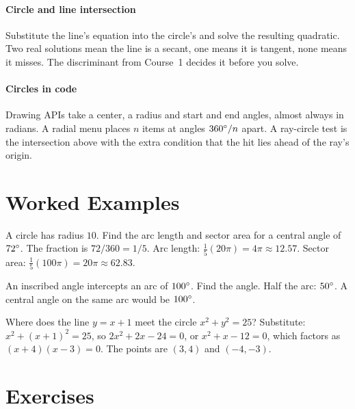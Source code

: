 \paragraph{Circle and line intersection} Substitute the line's equation into the circle's and solve the resulting quadratic. Two real solutions mean the line is a secant, one means it is tangent, none means it misses. The discriminant from Course~1 decides it before you solve.

\paragraph{Circles in code} Drawing APIs take a center, a radius and start and end angles, almost always in radians. A radial menu places $n$ items at angles $360^\circ/n$ apart. A ray-circle test is the intersection above with the extra condition that the hit lies ahead of the ray's origin.

\section{Worked Examples}

\begin{example}
A circle has radius $10$. Find the arc length and sector area for a central angle of $72^\circ$.
\solution The fraction is $72/360 = 1/5$. Arc length: $\tfrac{1}{5}(20\pi) = 4\pi \approx 12.57$. Sector area: $\tfrac{1}{5}(100\pi) = 20\pi \approx 62.83$.
\end{example}

\begin{example}
An inscribed angle intercepts an arc of $100^\circ$. Find the angle.
\solution Half the arc: $50^\circ$. A central angle on the same arc would be $100^\circ$.
\end{example}

\begin{example}
Where does the line $y = x + 1$ meet the circle $x^2 + y^2 = 25$?
\solution Substitute: $x^2 + (x + 1)^2 = 25$, so $2x^2 + 2x - 24 = 0$, or $x^2 + x - 12 = 0$, which factors as $(x + 4)(x - 3) = 0$. The points are $(3, 4)$ and $(-4, -3)$.
\end{example}

\section{Exercises}

